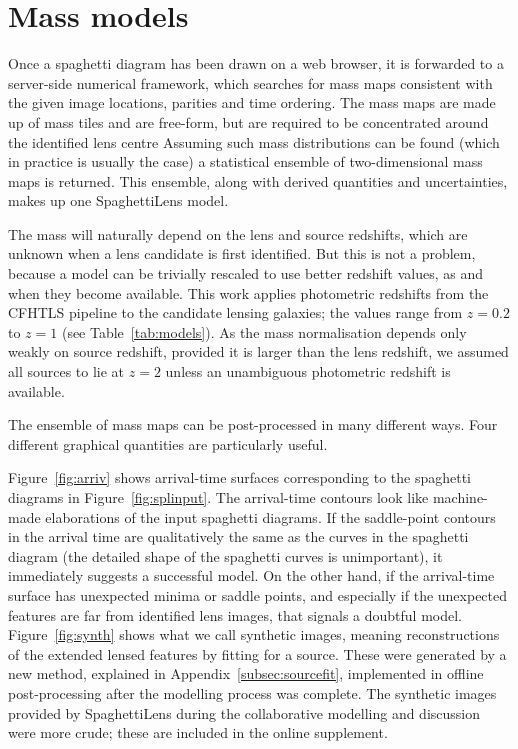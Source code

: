 \section{Mass models}\label{sec:massmodels}

Once a spaghetti diagram has been drawn on a web browser, it is
forwarded to a server-side numerical framework, which searches for
mass maps consistent with the given image locations, parities and time
ordering.  The mass maps are made up of mass tiles and are free-form,
but are required to be concentrated around the identified lens centre
\citep[see][for the precise formulation of the search
  problem.]{2014MNRAS.445.2181C} Assuming such mass distributions can
be found (which in practice is usually the case) a statistical
ensemble of two-dimensional mass maps is returned.  This ensemble,
along with derived quantities and uncertainties, makes up one
SpaghettiLens model.

The mass will naturally depend on the lens and source redshifts, which
are unknown when a lens candidate is first identified.  But this is
not a problem, because a model can be trivially rescaled to use better
redshift values, as and when they become available.  This work applies
photometric redshifts from the CFHTLS pipeline
\citep{2009A&A...500..981C}
to the candidate
lensing galaxies; the values range from $z=0.2$ to $z=1$ (see
Table~\ref{tab:models}).  As the mass normalisation depends only weakly
on source redshift, provided it is larger than the lens redshift,
we assumed all sources to lie at $z=2$ unless an unambiguous photometric
redshift is available.

The ensemble of mass maps can be post-processed in many different
ways.  Four different graphical quantities are particularly useful.

Figure~\ref{fig:arriv} shows arrival-time surfaces corresponding to
the spaghetti diagrams in Figure~\ref{fig:splinput}.  The arrival-time
contours look like machine-made elaborations of the input spaghetti
diagrams.  If the saddle-point contours in the arrival time are
qualitatively the same as the curves in the spaghetti diagram (the
detailed shape of the spaghetti curves is unimportant), it immediately
suggests a successful model.  On the other hand, if the arrival-time
surface has unexpected minima or saddle points, and especially if the
unexpected features are far from identified lens images, that signals
a doubtful model.  Figure~\ref{fig:synth} shows what we call synthetic
images, meaning reconstructions of the extended lensed features by
fitting for a source.  These were generated by a new method, explained
in Appendix~\ref{subsec:sourcefit}, implemented in offline
post-processing after the modelling process was complete.  The
synthetic images provided by SpaghettiLens during the collaborative
modelling and discussion were more crude; these are included in the
online supplement.

